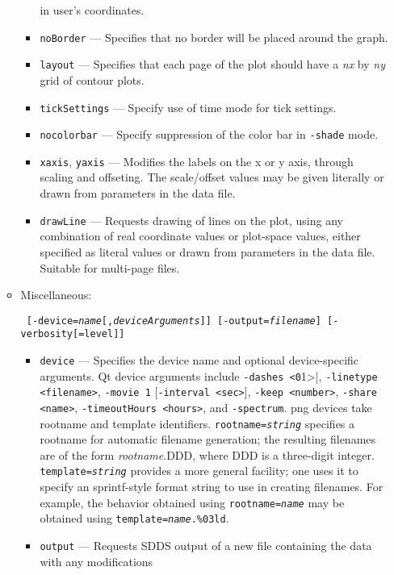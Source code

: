 \begin{itemize}
\begin{itemize}
\begin{itemize}
        in user's coordinates.  
        \item \verb|noBorder| --- Specifies that no border will be placed around the graph.
        \item \verb|layout| --- Specifies that each page of the plot should have a {\em nx} by {\em ny} grid of contour plots.
        \item \verb|tickSettings| --- Specify use of time mode for tick settings.
        \item \verb|nocolorbar| --- Specify suppression of the color bar in \verb|-shade| mode.
        \item \verb|xaxis|, \verb|yaxis| --- Modifies the labels on the x or y axis, through scaling and offseting.
          The scale/offset values may be given literally or drawn from parameters in the data file.
        \item \verb|drawLine| --- Requests drawing of lines on the plot, using any combination of real coordinate values
          or plot-space values, either specified as literal values or drawn from parameters in the data file.
          Suitable for multi-page files.
        \end{itemize}
    \item Miscellaneous:
\begin{flushleft}{\tt
[-device={\em name}[,{\em deviceArguments}]] 
[-output={\em filename}] [-verbosity[=level]]
}\end{flushleft}
        \begin{itemize}
        \item \verb|device| --- Specifies the device name and optional device-specific arguments. Qt device
        arguments include \verb|-dashes <0|1>|, \verb|-linetype <filename>|, \verb|-movie 1| [\verb|-interval <sec>|],
        \verb|-keep <number>|, \verb|-share <name>|, \verb|-timeoutHours <hours>|, and \verb|-spectrum|. png devices
        take rootname and template identifiers. {\tt rootname={\em string}} specifies a rootname
        for automatic filename generation; the resulting filenames are of the form {\em rootname}.DDD, where DDD
        is a three-digit integer. {\tt template={\em string}} provides a more general facility; one uses it to
        specify an sprintf-style format string to use in creating filenames. For example, the behavior obtained
        using {\tt rootname={\em name}} may be obtained  using {\tt template={\em name}.\%03ld}.
        \item \verb|output| --- Requests SDDS output of a new file containing the data with any modifications

\end{itemize}
\end{itemize}
\end{itemize}
